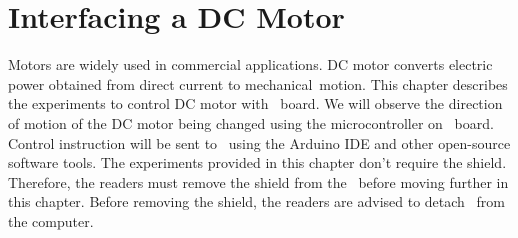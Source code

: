 \chapter{Interfacing a DC Motor}
\thispagestyle{empty}
\label{dcmotor}
\newcommand{\LocDCMfig}{\Origin/user-code/dcmotor/figures}
\newcommand{\LocDCMscicode}{\Origin/user-code/dcmotor/scilab}
\newcommand{\LocDCMscibrief}[1]{{\tt \seqsplit{
        Origin/user-code/dcmotor/scilab/#1}},
  see \fnrefp{fn:file-loc}}
\newcommand{\LocDCMardcode}{\Origin/user-code/dcmotor/arduino}
\newcommand{\LocDCMardbrief}[1]{{\tt \seqsplit{
        Origin/user-code/dcmotor/arduino/#1}},
  see \fnrefp{fn:file-loc}}

\newcommand{\LocDCMpycode}{\Origin/user-code/dcmotor/python}
\newcommand{\LocDCMpybrief}[1]{{\tt \seqsplit{
        Origin/user-code/dcmotor/python/#1}},
  see \fnrefp{fn:file-loc}}

\newcommand{\LocDCMjuliacode}{\Origin/user-code/dcmotor/julia}
\newcommand{\LocDCMjuliabrief}[1]{{\tt \seqsplit{
        Origin/user-code/dcmotor/julia/#1}},
  see \fnrefp{fn:file-loc}}

\newcommand{\LocDCMOpenModelicacode}{\Origin/user-code/dcmotor/OpenModelica}  %
\newcommand{\LocDCMOpenModelicabrief}[1]{{\tt \seqsplit{%
        Origin/user-code/led/OpenModelica/#1}}, see \fnrefp{fn:file-loc}} %


Motors are widely used in commercial applications. 
DC motor converts electric power obtained from direct current to 
mechanical motion. This chapter describes the experiments to 
control DC motor with \arduino\ board. We will observe the 
direction of motion of the DC motor being changed 
using the microcontroller on \arduino\ board. 
Control instruction will be sent to \arduino\ using the Arduino IDE and other open-source software tools. 
The experiments provided in this chapter don't require the shield. 
Therefore, the readers must remove the shield from the \arduino\ before 
moving further in this chapter. Before removing the shield, 
the readers are advised to detach \arduino\ from the computer. 

